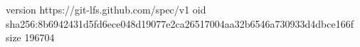 version https://git-lfs.github.com/spec/v1
oid sha256:8b6942431d5fd6ece048d19077e2ca26517004aa32b6546a730933d4dbce166f
size 196704
